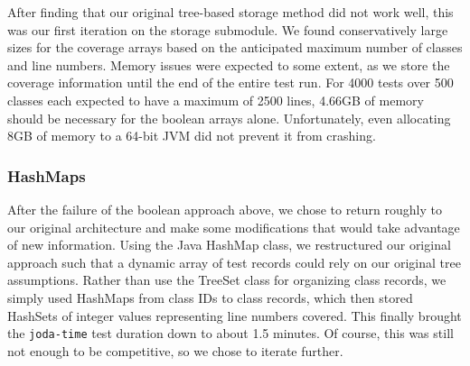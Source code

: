 After finding that our original tree-based storage method did not work well, this was our first iteration on the storage submodule. We found conservatively large sizes for the coverage arrays based on the anticipated maximum number of classes and line numbers. Memory issues were expected to some extent, as we store the coverage information until the end of the entire test run. For 4000 tests over 500 classes each expected to have a maximum of 2500 lines, 4.66GB of memory should be necessary for the boolean arrays alone. Unfortunately, even allocating 8GB of memory to a 64-bit JVM did not prevent it from crashing.

\subsubsection{HashMaps}

After the failure of the boolean approach above, we chose to return roughly to our original architecture and make some modifications that would take advantage of new information. Using the Java HashMap class, we restructured our original approach such that a dynamic array of test records could rely on our original tree assumptions. Rather than use the TreeSet class for organizing class records, we simply used HashMaps from class IDs to class records, which then stored HashSets of integer values representing line numbers covered. This finally brought the \texttt{joda-time} test duration down to about 1.5 minutes. Of course, this was still not enough to be competitive, so we chose to iterate further.



